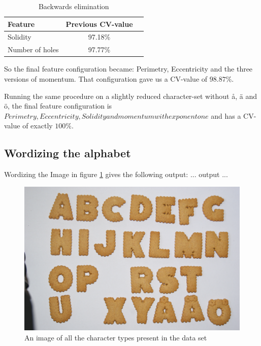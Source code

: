 \documentclass[a4paper,11pt]{article}
\begin{document}
\begin{table}[h!b!p!]
\caption{Backwards elimination}
\begin{center}
    \begin{tabular}{ l | c | c | }
    Feature         & Previous CV-value \\ \hline
    Solidity        & 97.18\%           \\ \hline
    Number of holes & 97.77\%           \\ \hline
    \end{tabular}
\end{center}
\label{tab:backelim}
\end{table}

So the final feature configuration became: Perimetry, Eccentricity and the three versions of momentum.
That configuration gave us a CV-value of $98.87\%$.

Running the same procedure on a slightly reduced character-set without å, ä and ö,
the final feature configuration is $ Perimetry, Eccentricity, Solidity  and momentum with exponent one$ and has a CV-value of exactly $100\%$. 


\subsection{Wordizing the alphabet}
Wordizing the Image in figure \ref{fig:alphabet} gives the following output:
... output ...

\begin{figure}[]
\begin{center}
\includegraphics[width=140mm]{alphabet.JPG}
\end{center}
\caption{An image of all the character types present in the data set}
\label{fig:alphabet}
\end{figure}
\end{document}
